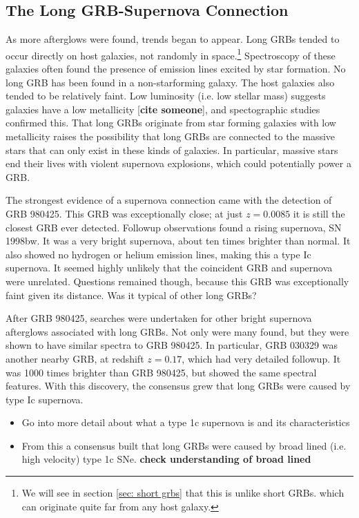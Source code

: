 \documentclass[11pt]{cuthesis}
\begin{document}
\subsection{The Long GRB-Supernova Connection}
As more afterglows were found, trends began to appear. Long GRBs tended to occur directly on host galaxies, not randomly in space.\footnote{We will see in section \ref{sec: short grbs} that this is unlike short GRBs. which can originate quite far from any host galaxy.} Spectroscopy of these galaxies often found the presence of emission lines excited by star formation. No long GRB has been found in a non-starforming galaxy. The host galaxies also tended to be relatively faint. Low luminosity (i.e. low stellar mass) suggests galaxies have a low metallicity [\textbf{cite someone}], and spectographic studies confirmed this. That long GRBs originate from star forming galaxies with low metallicity raises the possibility that long GRBs are connected to the massive stars that can only exist in these kinds of galaxies. In particular, massive stars end their lives with violent supernova explosions, which could potentially power a GRB. 

The strongest evidence of a supernova connection came with the detection of GRB 980425. This GRB was exceptionally close; at just $z=0.0085$ it is still the closest GRB ever detected. Followup observations found a rising supernova, SN 1998bw. It was a very bright supernova, about ten times brighter than normal. It also showed no hydrogen or helium emission lines, making this a type Ic supernova. It seemed highly unlikely that the coincident GRB and supernova were unrelated. Questions remained though, because this GRB was exceptionally faint given its distance. Was it typical of other long GRBs? 

After GRB 980425, searches were undertaken for other bright supernova afterglows associated with long GRBs. Not only were many found, but they were shown to have similar spectra to GRB 980425. In particular, GRB 030329 was another nearby GRB, at redshift $z=0.17$, which had very detailed followup. It was 1000 times brighter than GRB 980425, but showed the same spectral features. With this discovery, the consensus grew that long GRBs were caused by type Ic supernova.

\begin{itemize}
\item Go into more detail about what a type 1c supernova is and its characteristics
\item From this a consensus built that long GRBs were caused by broad lined (i.e. high velocity) type 1c SNe. \textbf{check understanding of broad lined} 
\end{itemize}
\end{document}
